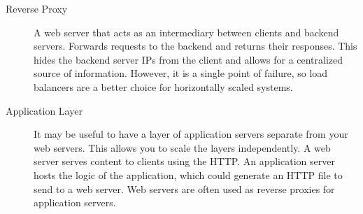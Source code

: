 \begin{description}
		\item[Reverse Proxy] A web server that acts as an intermediary between clients and backend servers. Forwards requests to the backend and returns their responses. This hides the backend server IPs from the client and allows for a centralized source of information. However, it is a single point of failure, so load balancers are a better choice for horizontally scaled systems.
		
		\item[Application Layer] It may be useful to have a layer of application servers separate from your web servers. This allows you to scale the layers independently. A web server serves content to clients using the HTTP. An application server hosts the logic of the application, which could generate an HTTP file to send to a web server. Web servers are often used as reverse proxies for application servers.
	\end{description}

	
